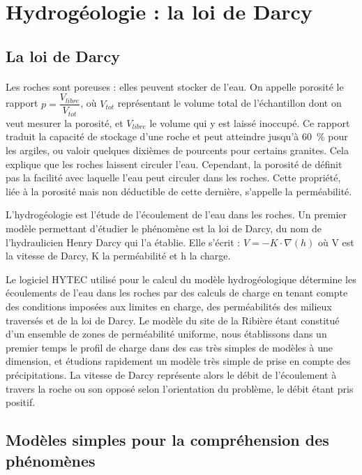 \documentclass{article}
\begin{document}
\newpage
\section{Hydrogéologie : la loi de Darcy}
\subsection{La loi de Darcy}

\paragraph{} Les roches sont poreuses : elles peuvent stocker de l’eau. On appelle porosité le rapport $p=\dfrac{V_{libre}}{V_{tot}}$, où $V_{tot}$ représentant le volume total de l'échantillon dont on veut mesurer la porosité, et $V_{libre}$ le volume qui y est laissé inoccupé. Ce rapport traduit la capacité de stockage d'une roche et peut atteindre jusqu’à 60~\% pour les argiles, ou valoir quelques dixièmes de pourcents pour certains granites. Cela explique que les roches laissent circuler l’eau. Cependant, la porosité de définit pas la facilité avec laquelle l’eau peut circuler dans les roches. Cette propriété, liée à la porosité mais non déductible de cette dernière, s’appelle la perméabilité.

L’hydrogéologie est l’étude de l’écoulement de l’eau dans les roches. Un premier modèle permettant d’étudier le phénomène est la loi de Darcy, du nom de l’hydraulicien Henry Darcy qui l’a établie. Elle s’écrit : $V = - K\cdot \nabla(h)$ où V est la vitesse de Darcy, K la perméabilité et h la charge. %

Le logiciel HYTEC utilisé pour le calcul du modèle hydrogéologique détermine les écoulements de l’eau dans les roches par des calculs de charge en tenant compte des conditions imposées aux limites en charge, des perméabilités des milieux traversés et de la loi de Darcy. Le modèle du site de la Ribière étant constitué d’un ensemble de zones de perméabilité uniforme, nous établissons dans un premier temps le profil de charge dans des cas très simples de modèles à une dimension, et étudions rapidement un modèle très simple de prise en compte des précipitations. La vitesse de Darcy représente alors le débit de l’écoulement à travers la roche ou son opposé selon l'orientation du problème, le débit étant pris positif. 
\subsection{Modèles simples pour la compréhension des phénomènes}
\end{document}
